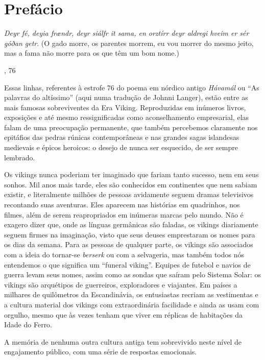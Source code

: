 \chapter[Prefácio, \emph{por Neil Price}]{Prefácio}\label{prefuxe1cio}

\epigraph{\emph{%
Deyr fé, deyia frændr, deyr siálfr it sama, en orztírr deyr aldregi
hveim er sér góðan getr}.\linebreak\linebreak 
(O gado morre, os parentes morrem, eu vou morrer do mesmo jeito, mas a
fama não morre para os que têm um bom nome.)}{, 76}

Essas linhas, referentes à estrofe 76 do poema em nórdico antigo
\emph{Hávamál} ou ``As palavras do altíssimo'' (aqui numa tradução de
Johnni Langer), estão entre as mais famosas sobreviventes 
da Era Viking. Reproduzidas em inúmeros livros, exposições e
até mesmo ressignificadas como aconselhamento empresarial, elas falam de
uma preocupação permanente, que também percebemos claramente nos
epitáfios das pedras rúnicas contemporâneas e nas grandes sagas
islandesas medievais e épicos heroicos: o desejo de nunca ser esquecido, de ser sempre lembrado.

Os vikings nunca poderiam ter imaginado que fariam tanto sucesso,
nem em seus sonhos. Mil anos mais tarde, eles são conhecidos em
continentes que nem sabiam existir, e literalmente milhões
de pessoas avidamente seguem dramas televisivos recontando suas
aventuras. Eles aparecem nas histórias em quadrinhos, nos filmes, além de serem
reapropriados em inúmeras marcas pelo mundo. Não é exagero dizer que,
onde as línguas germânicas são faladas, os vikings diariamente seguem
firmes na imaginação, visto que seus deuses emprestaram os nomes para os
dias da semana. Para as pessoas de qualquer parte, os vikings são
associados com a ideia do tornar-se \emph{berserk} ou com a selvageria, mas também
todos nós entendemos o que significa um ``funeral viking''. Equipes de
futebol e navios de guerra levam seus nomes, assim como as sondas que
saíram pelo Sistema Solar: os vikings são arquétipos de guerreiros,
exploradores e viajantes. Em países a milhares de quilômetros da
Escandinávia, os entusiastas recriam as vestimentas e a cultura material
dos vikings com extraordinária facilidade e ainda as usam com orgulho,
mesmo que às vezes tenham que viver em réplicas de habitações da Idade
do Ferro.

A memória de nenhuma outra cultura antiga tem sobrevivido neste nível de
engajamento público, com uma série de respostas emocionais.

